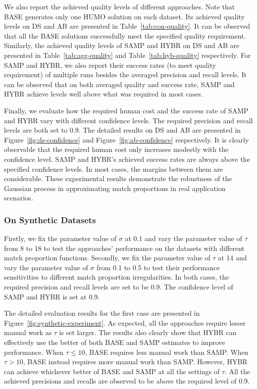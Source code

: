   We also report the achieved quality levels of different approaches. Note that BASE generates only one HUMO solution on each dataset. Its achieved quality levels on DS and AB are presented in Table~\ref{tab:con-quality}. It can be observed that all the BASE solutions successfully meet the specified quality requirement. Similarly, the achieved quality levels of SAMP and HYBR on DS and AB are presented in Table~\ref{tab:agg-quality} and Table~\ref{tab:hyb-quality} respectively. For SAMP and HYBR, we also report their success rates (to meet quality requirement) of multiple runs besides the averaged precision and recall levels. It can be observed that on both averaged quality and success rate, SAMP and HYBR achieve levels well above what was required in most cases.

  Finally, we evaluate how the required human cost and the success rate of SAMP and HYBR vary with different confidence levels. The required precision and recall levels are both set to 0.9. The detailed results on DS and AB are presented in Figure~\ref{fig:ds-confidence} and Figure~\ref{fig:ab-confidence} respectively. It is clearly observable that the required human cost only increases modestly with the confidence level. SAMP and HYBR's achieved success rates are always above the specified confidence levels. In most cases, the margins between them are considerable. These experimental results demonstrate the robustness of the Gaussian process in approximating match proportions in real application scenarios.

\subsubsection{On Synthetic Datasets}


  Firstly, we fix the parameter value of $\sigma$ at 0.1 and vary the parameter value of $\tau$ from 8 to 18 to test the approaches' performance on the datasets with different match proportion functions. Secondly, we fix the parameter value of $\tau$ at 14 and vary the parameter value of $\sigma$ from 0.1 to 0.5 to test their performance sensitivities to different match proportion irregularities. In both cases, the required precision and recall levels are set to be 0.9. The confidence level of SAMP and HYBR is set at 0.9.

   The detailed evaluation results for the first case are presented in Figure~\ref{fig:synthetic-experiment}. As expected, all the approaches require lesser manual work as $\tau$ is set larger. The results also clearly show that HYBR can effectively use the better of both BASE and SAMP estimates to improve performance. When $\tau\leq10$, BASE requires less manual work than SAMP. When $\tau> 10$, BASE instead requires more manual work than SAMP. However, HYBR can achieve whichever better of BASE and SAMP at all the settings of $\tau$. All the achieved precisions and recalls are observed to be above the required level of 0.9.


